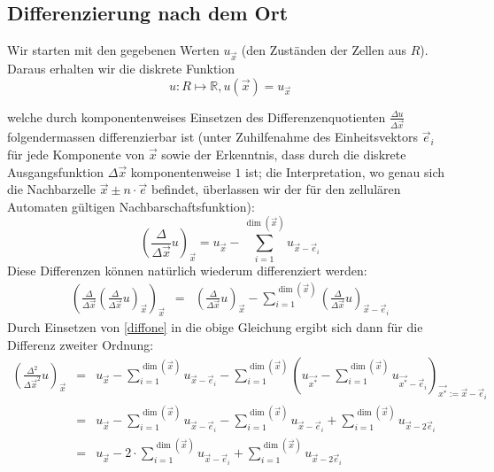\documentclass[11pt]{article} %
\theoremstyle{definition}
\begin{document}
\subsection{Differenzierung nach dem Ort}


Wir starten mit den gegebenen Werten $u_{\vec x}$ (den Zuständen der Zellen aus $R$). Daraus erhalten wir die diskrete Funktion
\[
u: R \mapsto \mathbb{R}, u(\vec x) = u_{\vec x}
\]

welche durch komponentenweises Einsetzen des Differenzenquotienten $\frac {\Delta u}{\Delta \vec x}$ folgendermassen differenzierbar ist (unter Zuhilfenahme des Einheitsvektors $\vec e_i$ für jede Komponente von $\vec x$ sowie der Erkenntnis, dass durch die diskrete Ausgangsfunktion $\Delta \vec{x}$ komponentenweise $1$ ist; die Interpretation, wo genau sich die Nachbarzelle $\vec x \pm n\cdot\vec e$ befindet, überlassen wir der für den zellulären Automaten gültigen Nachbarschaftsfunktion):
\begin{equation}\label{diffone}
	\left(\frac {\Delta}{\Delta \vec x} u\right)_{\vec x} = u_{\vec x} - \sum\limits_{i=1}^{\dim(\vec x)} u_{\vec x - \vec e_i}
\end{equation}
Diese Differenzen können natürlich wiederum differenziert werden:
\begin{eqnarray*}
	\left(\frac{\Delta}{\Delta \vec x}\left( \frac {\Delta}{\Delta \vec x} u \right)_{\vec x}\right)_{\vec x} &=& \left(\frac {\Delta}{\Delta \vec x} u\right)_{\vec x} - \sum\limits_{i=1}^{\dim(\vec x)} \left( \frac {\Delta}{\Delta \vec x} u \right)_{\vec x - \vec e_i}
\end{eqnarray*}
Durch Einsetzen von \ref{diffone} in die obige Gleichung ergibt sich dann für die Differenz zweiter Ordnung:
\begin{eqnarray*}
\left( \frac{\Delta^2}{\Delta \vec x^2} u\right)_{\vec x} &=& u_{\vec x} - \sum\limits_{i=1}^{\dim(\vec x)} u_{\vec x - \vec e_i} - 
\sum\limits_{i=1}^{\dim(\vec x)} \left( u_{\vec {x^*}} - \sum\limits_{i=1}^{\dim(\vec x)} u_{\vec {x^*} - \vec e_i} \right)_{\vec {x^*} := \vec x - \vec e_i} \\
&=& u_{\vec x} - \sum\limits_{i=1}^{\dim(\vec x)} u_{\vec x - \vec e_i} - \sum\limits_{i=1}^{\dim(\vec x)} u_{\vec x - \vec e_i} + \sum\limits_{i=1}^{\dim(\vec x)} u_{\vec x - 2\vec e_i} \\
&=&  u_{\vec x} - 2\cdot\sum\limits_{i=1}^{\dim(\vec x)} u_{\vec x - \vec e_i} + \sum\limits_{i=1}^{\dim(\vec x)} u_{\vec x - 2\vec e_i}
\end{eqnarray*}
\end{document}
